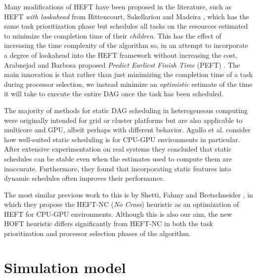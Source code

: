 \documentclass[runningheads]{llncs}
\begin{document}
Many modifications of HEFT have been proposed in the literature, such as HEFT {\em with lookahead} from Bittencourt, Sakellariou and Madeira \cite{bittencourt10}, which has the same task prioritization phase but schedules all tasks on the resources estimated to minimize the completion time of their {\em children}. This has the effect of increasing the time complexity of the algorithm so, in an attempt to incorporate a degree of lookahead into the HEFT framework without increasing the cost, Arabnejad and Barbosa proposed {\em Predict Earliest Finish Time} (PEFT) \cite{arabnejad14}. The main innovation is that rather than just minimizing the completion time of a task during processor selection, we instead minimize an {\em optimistic} estimate of the time it will take to execute the entire DAG once the task has been scheduled.

The majority of methods for static DAG scheduling in heterogeneous computing were originally intended for grid or cluster platforms but are also applicable to multicore and GPU, albeit perhaps with different behavior. Agullo et al. \cite{agullo2016} consider how well-suited static scheduling is for CPU-GPU environments in particular. After extensive experimentation on real systems they concluded that static schedules can be stable even when the estimates used to compute them are inaccurate. Furthermore, they found that incorporating static features into dynamic schedules often improves their performance. 

The most similar previous work to this is by Shetti, Fahmy and Bretschneider \cite{shetti2013optimization}, in which they propose the HEFT-NC ({\em No Cross}) heuristic as an optimization of HEFT for CPU-GPU environments. Although this is also our aim, the new HOFT heuristic differs significantly from HEFT-NC in both the task prioritization and processor selection phases of the algorithm. 



\section{Simulation model}
\label{sect.simulator}
\end{document}
